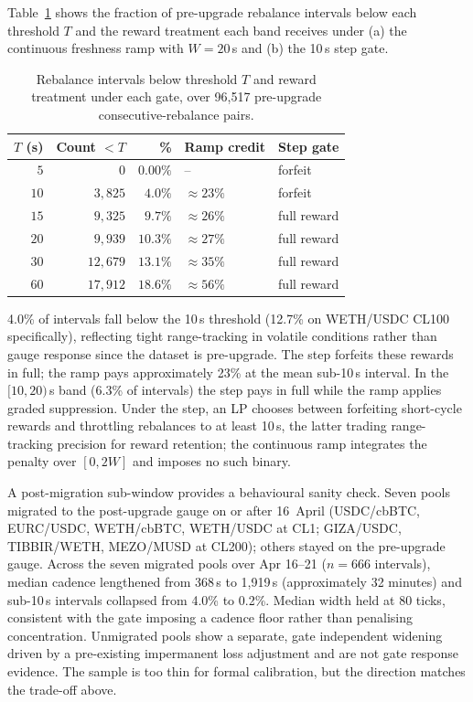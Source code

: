 \documentclass[11pt,a4paper]{article}
\theoremstyle{definition}
\theoremstyle{plain}
\theoremstyle{remark}
\begin{document}
Table~\ref{tab:threshold} shows the fraction of pre-upgrade rebalance intervals below each threshold $T$ and the reward treatment each band receives under (a) the continuous freshness ramp with $W = 20$\,s and (b) the 10\,s step gate.

\begin{table}[H]
\centering
\caption{Rebalance intervals below threshold $T$ and reward treatment under each gate, over 96{,}517 pre-upgrade consecutive-rebalance pairs.}
\label{tab:threshold}
\begin{tabular}{@{}rrrll@{}}
\toprule
$T$ (s) & Count $< T$ & \% & Ramp credit & Step gate \\
\midrule
$5$   & $0$        & $0.00\%$ & --                & forfeit \\
$10$  & $3{,}825$  & $4.0\%$  & $\approx 23\%$    & forfeit \\
$15$  & $9{,}325$  & $9.7\%$  & $\approx 26\%$    & full reward \\
$20$  & $9{,}939$  & $10.3\%$ & $\approx 27\%$    & full reward \\
$30$  & $12{,}679$ & $13.1\%$ & $\approx 35\%$    & full reward \\
$60$  & $17{,}912$ & $18.6\%$ & $\approx 56\%$    & full reward \\
\bottomrule
\end{tabular}
\end{table}

4.0\% of intervals fall below the 10\,s threshold (12.7\% on WETH/USDC CL100 specifically), reflecting tight range-tracking in volatile conditions rather than gauge response since the dataset is pre-upgrade. The step forfeits these rewards in full; the ramp pays approximately 23\% at the mean sub-10\,s interval. In the $[10, 20)$\,s band (6.3\% of intervals) the step pays in full while the ramp applies graded suppression. Under the step, an LP chooses between forfeiting short-cycle rewards and throttling rebalances to at least 10\,s, the latter trading range-tracking precision for reward retention; the continuous ramp integrates the penalty over $[0, 2W]$ and imposes no such binary.

A post-migration sub-window provides a behavioural sanity check. Seven pools migrated to the post-upgrade gauge on or after 16~April (USDC/cbBTC, EURC/USDC, WETH/cbBTC, WETH/USDC at CL1; GIZA/USDC, TIBBIR/WETH, MEZO/MUSD at CL200); others stayed on the pre-upgrade gauge. Across the seven migrated pools over Apr 16--21 ($n = 666$ intervals), median cadence lengthened from 368\,s to 1{,}919\,s (approximately 32 minutes) and sub-10\,s intervals collapsed from 4.0\% to 0.2\%. Median width held at 80 ticks, consistent with the gate imposing a cadence floor rather than penalising concentration. Unmigrated pools show a separate, gate independent widening driven by a pre-existing impermanent loss adjustment and are not gate response evidence. The sample is too thin for formal calibration, but the direction matches the trade-off above.
\end{document}

